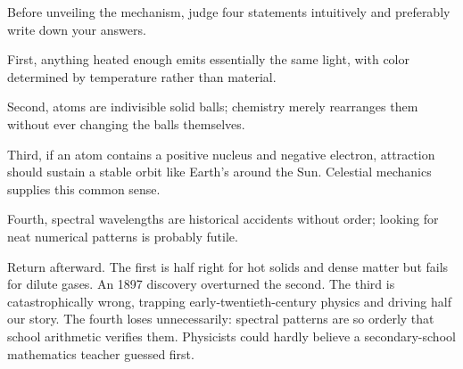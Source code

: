 
\begin{mainline}
Before unveiling the mechanism, judge four statements intuitively and preferably write down your answers.

First, anything heated enough emits essentially the same light, with color determined by temperature rather than material.

Second, atoms are indivisible solid balls; chemistry merely rearranges them without ever changing the balls themselves.

Third, if an atom contains a positive nucleus and negative electron, attraction should sustain a stable orbit like Earth's around the Sun. Celestial mechanics supplies this common sense.

Fourth, spectral wavelengths are historical accidents without order; looking for neat numerical patterns is probably futile.

Return afterward. The first is half right for hot solids and dense matter but fails for dilute gases. An 1897 discovery overturned the second. The third is catastrophically wrong, trapping early-twentieth-century physics and driving half our story. The fourth loses unnecessarily: spectral patterns are so orderly that school arithmetic verifies them. Physicists could hardly believe a secondary-school mathematics teacher guessed first.
\end{mainline}


